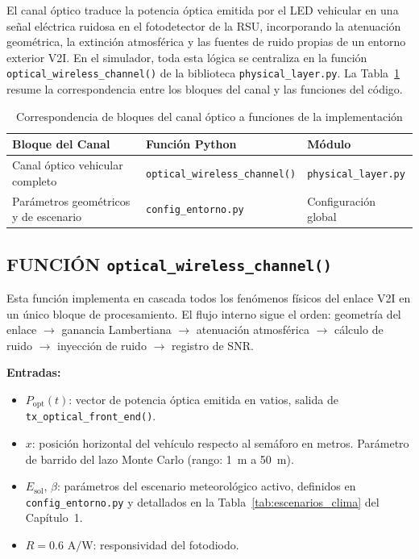 El canal óptico traduce la potencia óptica emitida por el LED vehicular en una señal eléctrica ruidosa en el fotodetector de la RSU, incorporando la atenuación geométrica, la extinción atmosférica y las fuentes de ruido propias de un entorno exterior V2I. En el simulador, toda esta lógica se centraliza en la función \texttt{optical\_wireless\_channel()} de la biblioteca \texttt{physical\_layer.py}. La Tabla~\ref{tab:funciones_canal} resume la correspondencia entre los bloques del canal y las funciones del código.

\begin{table}[H]
\centering
\caption{Correspondencia de bloques del canal óptico a funciones de la implementación}
\label{tab:funciones_canal}
\begin{tabular}{|p{5.2cm}|p{4.8cm}|p{4.2cm}|}
\hline
\textbf{Bloque del Canal} & \textbf{Función Python} & \textbf{Módulo} \\ \hline
Canal óptico vehicular completo & \texttt{optical\_wireless\_channel()} & \texttt{physical\_layer.py} \\ \hline
Parámetros geométricos y de escenario & \texttt{config\_entorno.py} & Configuración global \\ \hline
\end{tabular}
\end{table}

\subsection{FUNCIÓN \texttt{optical\_wireless\_channel()}}

Esta función implementa en cascada todos los fenómenos físicos del enlace V2I en un único bloque de procesamiento. El flujo interno sigue el orden: geometría del enlace $\rightarrow$ ganancia Lambertiana $\rightarrow$ atenuación atmosférica $\rightarrow$ cálculo de ruido $\rightarrow$ inyección de ruido $\rightarrow$ registro de SNR.

\textbf{Entradas:}
\begin{itemize}
    \item $P_{\text{opt}}(t)$: vector de potencia óptica emitida en vatios, salida de \texttt{tx\_optical\_front\_end()}.
    \item $x$: posición horizontal del vehículo respecto al semáforo en metros. Parámetro de barrido del lazo Monte Carlo (rango: 1~m a 50~m).
    \item $E_{\text{sol}}$, $\beta$: parámetros del escenario meteorológico activo, definidos en \texttt{config\_entorno.py} y detallados en la Tabla~\ref{tab:escenarios_clima} del Capítulo~1.
    \item $R = 0.6\text{ A/W}$: responsividad del fotodiodo.
\end{itemize}

